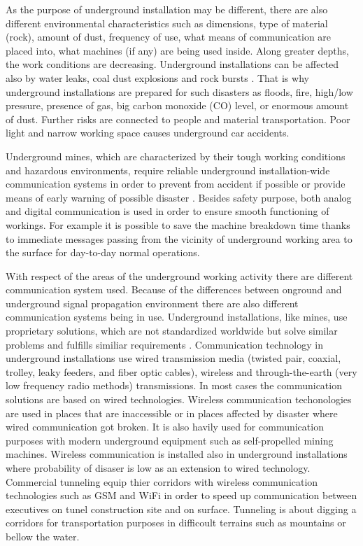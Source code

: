 \documentclass[../main.tex]{subfiles}
\begin{document}
As the purpose of underground installation may be different, there are also different environmental characteristics such as dimensions, type of material (rock), amount of dust, frequency of use, what means of communication are placed into, what machines (if any) are being used inside. Along greater depths, the work conditions are decreasing.  Underground installations can be affected also by water leaks, coal dust explosions and rock bursts \cite{WSN_monitoring}. That is why underground installations are prepared for such disasters as floods, fire, high/low pressure, presence of gas, big carbon monoxide (CO) level, or enormous amount of dust. Further risks are connected to people and material transportation. Poor light and narrow working space causes underground car accidents.

Underground mines, which are characterized by their tough working conditions and hazardous environments, require reliable underground installation-wide communication systems in order to prevent from accident if possible or provide means of early warning of possible disaster \cite{Book_wireless_in_mines}. Besides safety purpose, both analog and digital communication is used in order to ensure smooth functioning of workings. For example it is possible to save the machine breakdown time thanks to immediate messages passing  from the vicinity of underground working area to the surface for day-to-day normal operations.

With respect of the areas of the underground working activity there are different communication system used. Because of the differences between onground and underground signal propagation environment there are also different communication systems being in use. Underground installations, like mines, use proprietary solutions, which are not standardized worldwide but solve similar problems and fulfills similiar requirements \cite{article-wireless-undeground-critics}\cite{article_mine_communications_safety}. Communication technology in underground installations use wired transmission media (twisted pair, coaxial, trolley, leaky feeders, and fiber optic cables), wireless and through-the-earth (very low frequency radio methods) transmissions. In most cases the communication solutions are based on wired technologies. Wireless communication techonologies are used in places that are inaccessible or in places affected by disaster where wired communication got broken. It is also havily used for communication purposes with modern underground equipment such as self-propelled mining machines\cite{Thesis_CM}. Wireless communication is installed also in underground installations where probability of disaser is low as an extension to wired technology. Commercial tunneling equip thier corridors with wireless communication technologies such as GSM and WiFi in order to speed up communication between executives on tunel construction site and on surface\cite{Book_wireless_in_mines}\cite{article_rf_propagation_practical_full}\cite{article_mine_communications_3_characteristics}. Tunneling is about digging a corridors for transportation purposes in difficoult terrains such as mountains or bellow the water.
\end{document}
